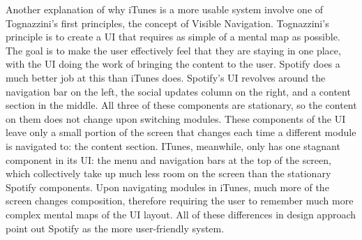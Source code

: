 \documentclass[12pt]{article}
\begin{document}
Another explanation of why iTunes is a more usable system involve 
one of Tognazzini's first principles, the concept of Visible 
Navigation. Tognazzini's principle is to create a UI that requires 
as simple of a mental map as possible. The goal is to make the 
user effectively feel that they are staying in one place, with the 
UI doing the work of bringing the content to the user. Spotify 
does a much better job at this than iTunes does. Spotify's UI 
revolves around the navigation bar on the left, the social updates 
column on the right, and a content section in the middle. All 
three of these components are stationary, so the content on them 
does not change upon switching modules. These components of the UI 
leave only a small portion of the screen that changes each time a 
different module is navigated to: the content section. ITunes, 
meanwhile, only has one stagnant component in its UI: the menu and 
navigation bars at the top of the screen, which collectively take 
up much less room on the screen than the stationary Spotify 
components. Upon navigating modules in iTunes, much more of the 
screen changes composition, therefore requiring the user to 
remember much more complex mental maps of the UI layout. All of 
these differences in design approach point out Spotify as the more 
user-friendly system.
\end{document}
